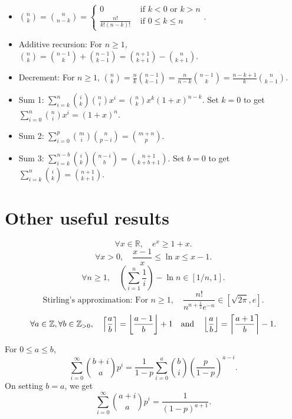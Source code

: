 \documentclass[a4paper, 12pt, fleqn]{article}
\begin{document}
\begin{itemize}
\item $\displaystyle \binom{n}{k} = \binom{n}{n-k} = \begin{cases}
    0 & \textrm{ if } k < 0 \textrm{ or } k > n
    \\ \frac{n!}{k!(n-k)!} & \textrm{ if } 0 \le k \le n \end{cases}$.
\item Additive recursion: For $n \ge 1$, $\displaystyle \binom{n}{k}
    = \binom{n-1}{k} + \binom{n-1}{k-1}
    = \binom{n+1}{k+1} - \binom{n}{k+1}$.
\item Decrement: For $n \ge 1$, $\displaystyle \binom{n}{k}
    = \frac{n}{k} \binom{n-1}{k-1}
    = \frac{n}{n-k} \binom{n-1}{k}
    = \frac{n-k+1}{k} \binom{n}{k-1}$.
\item Sum 1: $\displaystyle \sum_{i=k}^n \binom{i}{k}\binom{n}{i}x^i = \binom{n}{k}x^k(1+x)^{n-k}$.
Set $k=0$ to get $\displaystyle \sum_{i=0}^n \binom{n}{i}x^i = (1+x)^n$.
\item Sum 2: $\displaystyle \sum_{i=0}^p \binom{m}{i}\binom{n}{p-i} = \binom{m+n}{p}$.
\item Sum 3: $\displaystyle \sum_{i=k}^{n-b} \binom{i}{k}\binom{n-i}{b} = \binom{n+1}{k+b+1}$.
Set $b=0$ to get $\displaystyle \sum_{i=k}^{n} \binom{i}{k} = \binom{n+1}{k+1}$.
\end{itemize}

\section{Other useful results}

\[ \forall x \in \mathbb{R},\quad e^x \ge 1 + x. \]
\[ \forall x > 0, \quad \frac{x-1}{x} \le \ln x \le x-1. \]
\[ \forall n \ge 1, \quad \left(\sum_{i=1}^n \frac{1}{i}\right) - \ln n \in [1/n, 1]. \]
\[ \textrm{Stirling's approximation: For } n \ge 1,\quad
    \frac{n!}{n^{n+\frac{1}{2}}e^{-n}} \in [\sqrt{2\pi}, e]. \]
\[ \forall a \in \mathbb{\mathbb{Z}}, \forall b \in \mathbb{Z}_{>0},\quad
    \left\lceil \frac{a}{b} \right\rceil = \left\lfloor \frac{a-1}{b} \right\rfloor+1 \quad\textrm{and}\quad
    \left\lfloor \frac{a}{b} \right\rfloor = \left\lceil \frac{a+1}{b} \right\rceil-1. \]

\begin{theorem}
For $0 \le a \le b$,
\[ \sum_{i=0}^{\infty} \binom{b+i}{a}p^i
    = \frac{1}{1-p}\sum_{i=0}^a \binom{b}{i}\left(\frac{p}{1-p}\right)^{a-i}. \]
On setting $b = a$, we get
\[ \sum_{i=0}^{\infty} \binom{a+i}{a}p^i = \frac{1}{(1-p)^{a+1}}. \]
\end{theorem}

\end{document}
